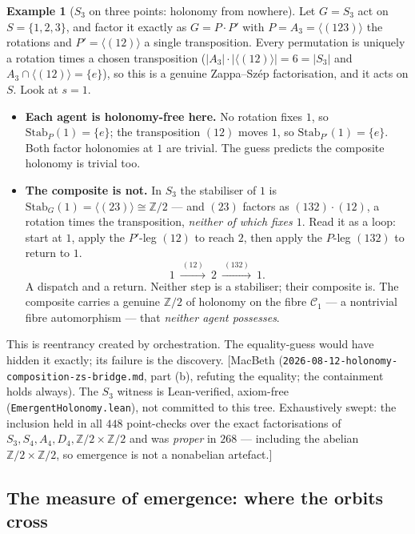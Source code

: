 \documentclass[11pt,a4paper]{book}
\theoremstyle{plain}
\theoremstyle{definition}
\newtheorem{Example}[Theorem]{Example}
\theoremstyle{remark}
\newcommand{\prov}[1]{\hfill\textsf{\footnotesize[#1]}}
\begin{document}
\begin{Example}[$S_{3}$ on three points: holonomy from nowhere]\label{ex:s3-emergent}
Let $G=S_{3}$ act on $S=\{1,2,3\}$, and factor it exactly as $G=P\cdot P'$ with
$P=A_{3}=\langle(123)\rangle$ the rotations and $P'=\langle(12)\rangle$ a single
transposition. Every permutation is uniquely a rotation times a chosen transposition
($|A_{3}|\cdot|{\langle(12)\rangle}|=6=|S_{3}|$ and $A_{3}\cap\langle(12)\rangle=\{e\}$),
so this is a genuine Zappa--Sz\'ep factorisation, and it acts on $S$. Look at $s=1$.
\begin{itemize}[nosep,leftmargin=1.4em]
  \item \textbf{Each agent is holonomy-free here.} No rotation fixes $1$, so
        $\mathrm{Stab}_{P}(1)=\{e\}$; the transposition $(12)$ moves $1$, so
        $\mathrm{Stab}_{P'}(1)=\{e\}$. Both factor holonomies at $1$ are trivial. The
        guess predicts the composite holonomy is trivial too.
  \item \textbf{The composite is not.} In $S_{3}$ the stabiliser of $1$ is
        $\mathrm{Stab}_{G}(1)=\langle(23)\rangle\cong\mathbb Z/2$ --- and $(23)$
        factors as $(132)\cdot(12)$, a rotation times the transposition, \emph{neither
        of which fixes $1$}. Read it as a loop: start at $1$, apply the $P'$-leg $(12)$
        to reach $2$, then apply the $P$-leg $(132)$ to return to $1$.
        \[
           1\ \xrightarrow{\ (12)\ }\ 2\ \xrightarrow{\ (132)\ }\ 1 .
        \]
        A dispatch and a return. Neither step is a stabiliser; their composite is. The
        composite carries a genuine $\mathbb Z/2$ of holonomy on the fibre
        $\mathcal C_{1}$ --- a nontrivial fibre automorphism --- that \emph{neither
        agent possesses}.
\end{itemize}
This is reentrancy created by orchestration. The equality-guess would have hidden it
exactly; its failure is the discovery.
\prov{MacBeth (\texttt{2026-08-12-holonomy-composition-zs-bridge.md}, part (b),
refuting the equality; the containment holds always). The $S_{3}$ witness is
Lean-verified, axiom-free (\texttt{EmergentHolonomy.lean}), not committed to this tree.
Exhaustively swept: the inclusion held in all $448$ point-checks over the exact
factorisations of $S_{3},S_{4},A_{4},D_{4},\mathbb Z/2{\times}\mathbb Z/2$ and was
\emph{proper} in $268$ --- including the abelian $\mathbb Z/2{\times}\mathbb Z/2$, so
emergence is not a nonabelian artefact.}
\end{Example}

\subsection*{The measure of emergence: where the orbits cross}
\end{document}
